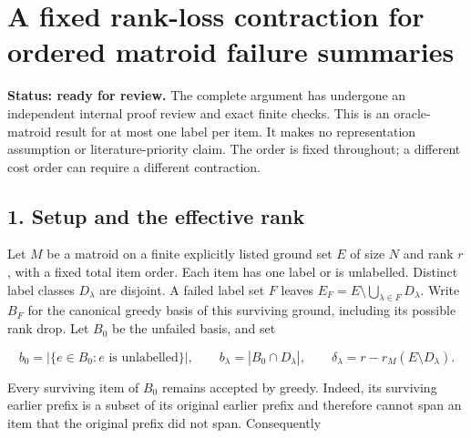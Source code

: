 
\hypertarget{af-b2bf8a6e14-a-fixed-rank-loss-contraction-for-ordered-matroid-failure-summaries}{%
\section{A fixed rank-loss contraction for ordered matroid failure summaries}\label{af-b2bf8a6e14-a-fixed-rank-loss-contraction-for-ordered-matroid-failure-summaries}}

\textbf{Status: ready for review.} The complete argument has undergone an independent internal proof review and exact finite checks. This is an oracle-matroid result for at most one label per item. It makes no representation assumption or literature-priority claim. The order is fixed throughout; a different cost order can require a different contraction.

\hypertarget{af-b2bf8a6e14-setup-and-the-effective-rank}{%
\subsection{1. Setup and the effective rank}\label{af-b2bf8a6e14-setup-and-the-effective-rank}}

Let \(M\) be a matroid on a finite explicitly listed ground set \(E\) of size \(N\) and rank \(r\), with a fixed total item order. Each item has one label or is unlabelled. Distinct label classes \(D_\lambda\) are disjoint. A failed label set \(F\) leaves \(E_F=E\setminus\bigcup_{\lambda\in F}D_\lambda\). Write \(B_F\) for the canonical greedy basis of this surviving ground, including its possible rank drop. Let \(B_0\) be the unfailed basis, and set

\[
b_0=|\{e\in B_0:e\text{ is unlabelled}\}|,\qquad
 b_\lambda=|B_0\cap D_\lambda|,\qquad
 \delta_\lambda=r-r_M(E\setminus D_\lambda).
\]

Every surviving item of \(B_0\) remains accepted by greedy. Indeed, its surviving earlier prefix is a subset of its original earlier prefix and therefore cannot span an item that the original prefix did not span. Consequently


